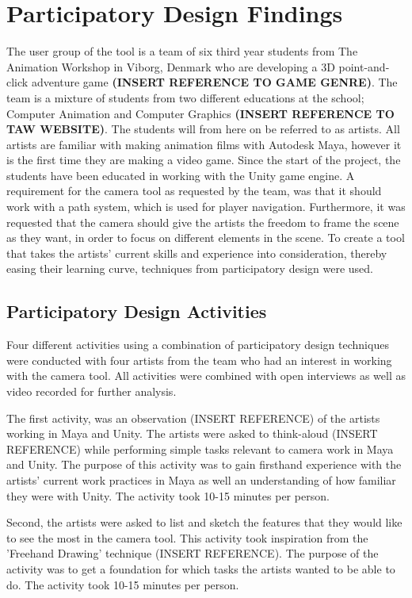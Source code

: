 \section{Participatory Design Findings}
The user group of the tool is a team of six third year students from The Animation Workshop in Viborg, Denmark who are developing a 3D point-and-click adventure game \textbf{(INSERT REFERENCE TO GAME GENRE)}.  The team is a mixture of students from two different educations at the school; Computer Animation and Computer Graphics \textbf{(INSERT REFERENCE TO TAW WEBSITE)}. The students will from here on be referred to as artists.  All artists are familiar with making animation films with Autodesk Maya, however it is the first time they are making a video game. Since the start of the project, the students have been educated in working with the Unity game engine.
A requirement for the camera tool as requested by the team, was that it should work with a path system, which is used for player navigation. Furthermore, it was requested that the camera should give the artists the freedom to frame the scene as they want, in order to focus on different elements in the scene.
To create a tool that takes the artists' current skills and experience into consideration, thereby easing their learning curve, techniques from participatory design were used.

\subsection{Participatory Design Activities}
Four different activities using a combination of participatory design techniques were conducted with four artists from the team who had an interest in working with the camera tool. All activities were combined with open interviews as well as video recorded for further analysis.

The first activity, was an observation (INSERT REFERENCE) of the artists working in Maya and Unity. The artists were asked to think-aloud (INSERT REFERENCE) while performing simple tasks relevant to camera work in Maya and Unity. The purpose of this activity was to gain firsthand experience with the artists' current work practices in Maya as well an understanding of how familiar they were with Unity. The activity took 10-15 minutes per person.

Second, the artists were asked to list and sketch the features that they would like to see the most in the camera tool. This activity took inspiration from the 'Freehand Drawing' technique (INSERT REFERENCE). The purpose of the activity was to get a foundation for which tasks the artists wanted to be able to do. The activity took 10-15 minutes per person.   

